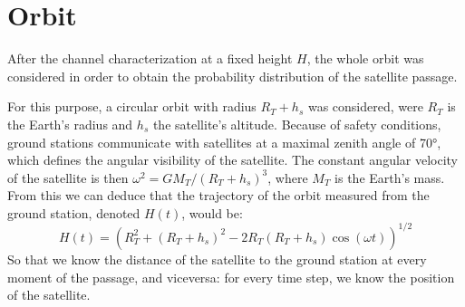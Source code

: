 \documentclass[%
 reprint,
 amsmath,amssymb,
 aps,
]{revtex4-1}
\begin{document}
\section{Orbit}
After the channel characterization at a fixed height $H$, the whole orbit was considered in order to obtain the probability distribution of the satellite passage.

For this purpose, a circular orbit with radius $R_T+h_s$ was considered, were $R_T$ is the Earth's radius and $h_s$ the satellite's altitude. Because of safety conditions, ground stations communicate with satellites at a maximal zenith angle of 70°, which defines the angular visibility of the satellite. The constant angular velocity of the satellite is then $\omega^2=GM_T/(R_T+h_s)^3$, where $M_T$ is the Earth's mass. From this we can deduce that the trajectory of the orbit measured from the ground station, denoted $H(t)$, would be:
\begin{equation}
    H(t)=(R_T^2+(R_T+h_s)^2-2R_T(R_T+h_s)\cos(\omega t))^{1/2}
    \label{traj}
\end{equation}
So that we know the distance of the satellite to the ground station at every moment of the passage, and viceversa: for every time step, we know the position of the satellite.
\end{document}
